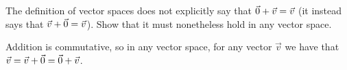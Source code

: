 
\begin{Exercise}[
name={},
title={}, 
difficulty=0,
origin={\cite{JH}}]

The definition of vector spaces does not explicitly say that
\( \vec{0}+\vec{v}=\vec{v} \)
(it instead says that \( \vec{v}+\vec{0}=\vec{v} \)).
Show that it must nonetheless hold in any vector space.

\end{Exercise}

\begin{Answer}

Addition is commutative, so in any vector space,
for any vector \( \vec{v} \) we have that
\( \vec{v}=\vec{v}+\vec{0}=\vec{0}+\vec{v} \).

\end{Answer}
